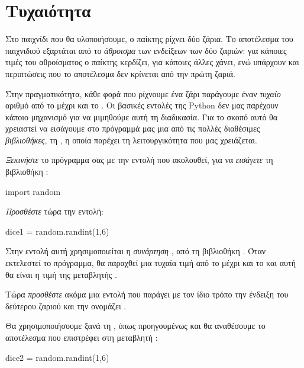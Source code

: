 \documentclass[a4paper,11pt,oneside]{book}
\begin{document}
\worksheettrue
\solutionstrue
{}

\section{Τυχαιότητα}

Στο παιχνίδι που θα υλοποιήσουμε, ο παίκτης ρίχνει δύο ζάρια. Το αποτέλεσμα του παιχνιδιού εξαρτάται από το \emph{άθροισμα} των ενδείξεων των δύο ζαριών: για κάποιες τιμές του αθροίσματος ο παίκτης κερδίζει, για κάποιες άλλες χάνει, ενώ υπάρχουν και περιπτώσεις που το αποτέλεσμα δεν κρίνεται από την πρώτη ζαριά.

Στην πραγματικότητα, κάθε φορά που ρίχνουμε ένα ζάρι παράγουμε έναν \emph{τυχαίο} αριθμό από το  μέχρι και το . Οι βασικές εντολές της Python δεν μας παρέχουν κάποιο μηχανισμό για να μιμηθούμε αυτή τη διαδικασία.
Για το σκοπό αυτό θα χρειαστεί να εισάγουμε στο πρόγραμμά μας μια από τις πολλές διαθέσιμες \emph{βιβλιοθήκες}, τη , η οποία παρέχει τη λειτουργικότητα που μας χρειάζεται.

\begin{step}
\emph{Ξεκινήστε} το πρόγραμμα σας με την εντολή που ακολουθεί, για να \emph{εισάγετε} τη βιβλιοθήκη :

\begin{pynew}
import random
\end{pynew}

\emph{Προσθέστε} τώρα την εντολή:

\begin{pynew}
dice1 = random.randint(1,6)
\end{pynew}

Στην εντολή αυτή χρησιμοποιείται η \emph{συνάρτηση} , από τη βιβλιοθήκη .
Όταν εκτελεστεί το πρόγραμμα, θα παραχθεί μια τυχαία τιμή από το  μέχρι και το  και αυτή θα είναι η τιμή της μεταβλητής .
\end{step}

\begin{step}
Τώρα \emph{προσθέστε} ακόμα μια εντολή που παράγει με τον ίδιο τρόπο την ένδειξη του δεύτερου ζαριού και την ονομάζει .

\begin{answer}
Θα χρησιμοποιήσουμε ξανά τη , όπως προηγουμένως και θα αναθέσουμε το αποτέλεσμα που επιστρέφει στη μεταβλητή :
	
\begin{pynew}
dice2 = random.randint(1,6)
\end{pynew}
\end{answer}
\end{step}
\end{document}
